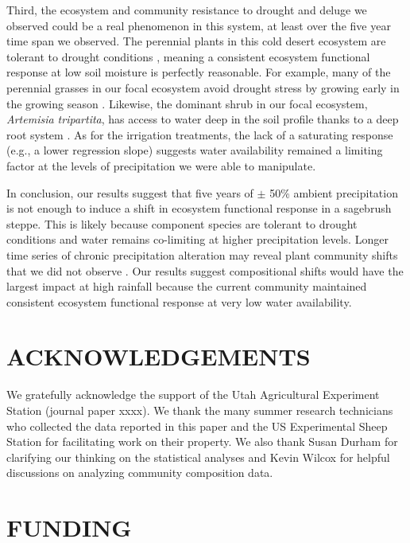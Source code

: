 \documentclass[fleqn,10pt,lineno]{wlpeerj} %
\begin{document}
Third, the ecosystem and community resistance to drought and deluge we
observed could be a real phenomenon in this system, at least over the
five year time span we observed. The perennial plants in this cold
desert ecosystem are tolerant to drought conditions \citep[A.R.
Kleinhesselink, unpublished data]{Bazzaz1979, Franks2011}, meaning a
consistent ecosystem functional response at low soil moisture is
perfectly reasonable. For example, many of the perennial grasses in our
focal ecosystem avoid drought stress by growing early in the growing
season \citep[A.R. Kleinhesselink, personal observation]{Blaisdell1958}.
Likewise, the dominant shrub in our focal ecosystem, \emph{Artemisia
tripartita}, has access to water deep in the soil profile thanks to a
deep root system \citep{Germino2014}. As for the irrigation treatments,
the lack of a saturating response (e.g., a lower regression slope)
suggests water availability remained a limiting factor at the levels of
precipitation we were able to manipulate.

In conclusion, our results suggest that five years of \(\pm\) 50\%
ambient precipitation is not enough to induce a shift in ecosystem
functional response in a sagebrush steppe. This is likely because
component species are tolerant to drought conditions and water remains
co-limiting at higher precipitation levels. Longer time series of
chronic precipitation alteration may reveal plant community shifts that
we did not observe \citep[e.g.,][]{Wilcox2016}. Our results suggest
compositional shifts would have the largest impact at high rainfall
because the current community maintained consistent ecosystem functional
response at very low water availability.

\section{ACKNOWLEDGEMENTS}\label{acknowledgements}

We gratefully acknowledge the support of the Utah Agricultural
Experiment Station (journal paper xxxx). We thank the many summer
research technicians who collected the data reported in this paper and
the US Experimental Sheep Station for facilitating work on their
property. We also thank Susan Durham for clarifying our thinking on the
statistical analyses and Kevin Wilcox for helpful discussions on
analyzing community composition data.

\section{FUNDING}\label{funding}
\end{document}
